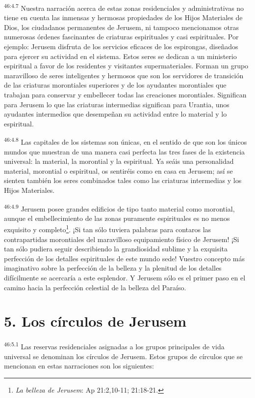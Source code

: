 \par
\textsuperscript{46:4.7} Nuestra narración acerca de estas zonas residenciales y administrativas no tiene en cuenta las inmensas y hermosas propiedades de los Hijos Materiales de Dios, los ciudadanos permanentes de Jerusem, ni tampoco mencionamos otras numerosas órdenes fascinantes de criaturas espirituales y casi espirituales. Por ejemplo: Jerusem disfruta de los servicios eficaces de los espirongas, diseñados para ejercer su actividad en el sistema. Estos seres se dedican a un ministerio espiritual a favor de los residentes y visitantes supermateriales. Forman un grupo maravilloso de seres inteligentes y hermosos que son los servidores de transición de las criaturas morontiales superiores y de los ayudantes morontiales que trabajan para conservar y embellecer todas las creaciones morontiales. Significan para Jerusem lo que las criaturas intermedias significan para Urantia, unos ayudantes intermedios que desempeñan su actividad entre lo material y lo espiritual.

\par
\textsuperscript{46:4.8} Las capitales de los sistemas son únicas, en el sentido de que son los únicos mundos que muestran de una manera casi perfecta las tres fases de la existencia universal: la material, la morontial y la espiritual. Ya seáis una personalidad material, morontial o espiritual, os sentiréis como en casa en Jerusem; así se sienten también los seres combinados tales como las criaturas intermedias y los Hijos Materiales.

\par
\textsuperscript{46:4.9} Jerusem posee grandes edificios de tipo tanto material como morontial, aunque el embellecimiento de las zonas puramente espirituales es no menos exquisito y completo\footnote{\textit{La belleza de Jerusem}: Ap 21:2,10-11; 21:18-21.}. ¡Si tan sólo tuviera palabras para contaros las contrapartidas morontiales del maravilloso equipamiento físico de Jerusem! ¡Si tan sólo pudiera seguir describiendo la grandiosidad sublime y la exquisita perfección de los detalles espirituales de este mundo sede! Vuestro concepto más imaginativo sobre la perfección de la belleza y la plenitud de los detalles difícilmente se acercaría a este esplendor. Y Jerusem sólo es el primer paso en el camino hacia la perfección celestial de la belleza del Paraíso.

\section*{5. Los círculos de Jerusem}
\par
\textsuperscript{46:5.1} Las reservas residenciales asignadas a los grupos principales de vida universal se denominan los círculos de Jerusem. Estos grupos de círculos que se mencionan en estas narraciones son los siguientes:

